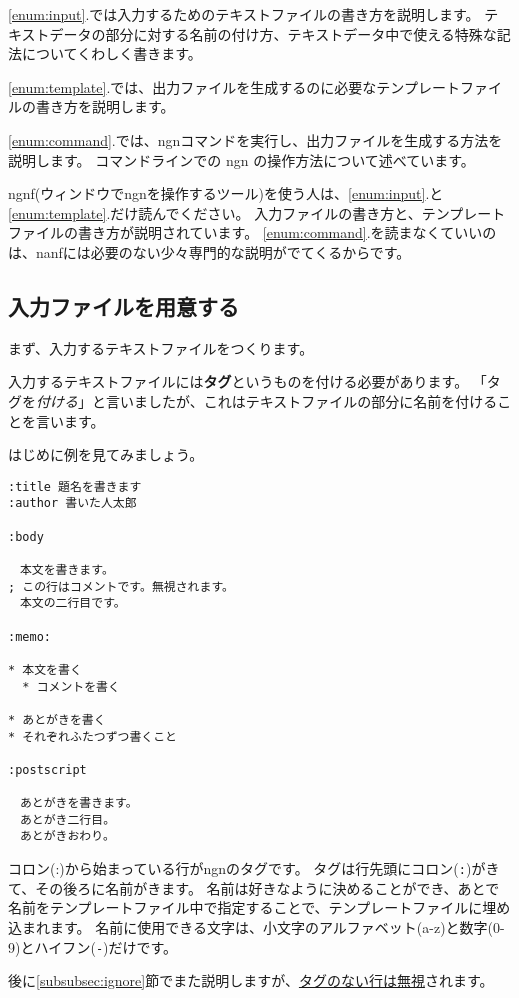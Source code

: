 \documentclass[a4j]{jsarticle}
\begin{document}
\ref{enum:input}.では入力するためのテキストファイルの書き方を説明します。
テキストデータの部分に対する名前の付け方、テキストデータ中で使える特殊な記法についてくわしく書きます。

\ref{enum:template}.では、出力ファイルを生成するのに必要なテンプレートファイルの書き方を説明します。

\ref{enum:command}.では、ngnコマンドを実行し、出力ファイルを生成する方法を説明します。
コマンドラインでの ngn の操作方法について述べています。

ngnf(ウィンドウでngnを操作するツール)を使う人は、\ref{enum:input}.と\ref{enum:template}.だけ読んでください。
入力ファイルの書き方と、テンプレートファイルの書き方が説明されています。
\ref{enum:command}.を読まなくていいのは、nanfには必要のない少々専門的な説明がでてくるからです。


\subsection{入力ファイルを用意する}

まず、入力するテキストファイルをつくります。

入力するテキストファイルには\textbf{タグ}というものを付ける必要があります。
「タグを\textit{付ける}」と言いましたが、これはテキストファイルの部分に名前を付けることを言います。

はじめに例を見てみましょう。

\begin{lstlisting}[caption=ngnタグ]
:title 題名を書きます
:author 書いた人太郎

:body

　本文を書きます。
; この行はコメントです。無視されます。
　本文の二行目です。

:memo:

* 本文を書く
  * コメントを書く

* あとがきを書く
* それぞれふたつずつ書くこと

:postscript

　あとがきを書きます。
　あとがき二行目。
　あとがきおわり。
\end{lstlisting}

コロン(:)から始まっている行がngnのタグです。
タグは行先頭にコロン(\verb|:|)がきて、その後ろに名前がきます。
名前は好きなように決めることができ、あとで名前をテンプレートファイル中で指定することで、テンプレートファイルに埋め込まれます。
名前に使用できる文字は、小文字のアルファベット(a-z)と数字(0-9)とハイフン(\verb|-|)だけです。

後に\ref{subsubsec:ignore}節でまた説明しますが、\underline{タグのない行は無視}されます。
\end{document}
